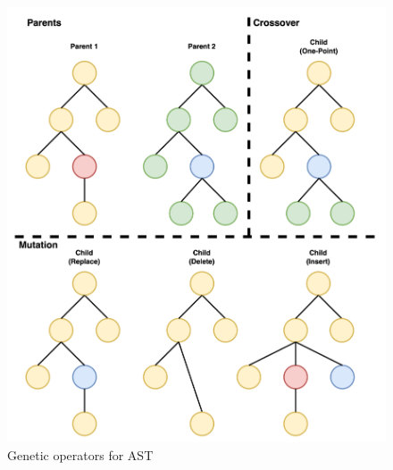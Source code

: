 \documentclass[10pt,conference]{IEEEtran}
\begin{document}
        \begin{figure}[h]
            \centering
            \includegraphics[scale=0.4]{repair.png}
            \caption{Genetic operators for AST}
            \label{fig:repair}
        \end{figure}
\end{document}
